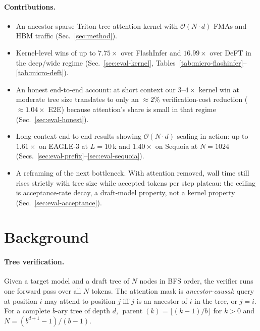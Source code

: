 \documentclass{article}
\newcommand{\bigO}[1]{\mathcal{O}(#1)}
\newcommand{\numtokens}{N}
\newcommand{\depth}{d}
\newcommand{\branching}{b}
\newcommand{\prefixlen}{L}
\DeclareMathOperator{\parent}{parent}
\begin{document}
\paragraph{Contributions.}
\begin{itemize}\itemsep0pt
  \item An ancestor-sparse Triton tree-attention kernel with
        $\bigO{\numtokens \!\cdot\! \depth}$ FMAs and HBM traffic
        (Sec.~\ref{sec:method}).
  \item Kernel-level wins of up to $7.75\times$ over FlashInfer and
        $16.99\times$ over DeFT in the deep/wide regime
        (Sec.~\ref{sec:eval-kernel}, Tables~\ref{tab:micro-flashinfer}--\ref{tab:micro-deft}).
  \item An honest end-to-end account: at short context our $3$--$4\times$
        kernel win at moderate tree size translates to only an
        $\approx\!2\%$ verification-cost reduction
        ($\approx\!1.04\times$ E2E) because attention's share is small
        in that regime (Sec.~\ref{sec:eval-honest}).
  \item Long-context end-to-end results showing
        $\bigO{\numtokens \!\cdot\! \depth}$ scaling in action: up to
        $1.61\times$ on EAGLE-3 at $\prefixlen{=}10\,$k and
        $1.40\times$ on Sequoia at $\numtokens{=}1024$
        (Secs.~\ref{sec:eval-prefix}--\ref{sec:eval-sequoia}).
  \item A reframing of the next bottleneck. With attention removed,
        wall time still rises strictly with tree size while accepted
        tokens per step plateau: the ceiling is acceptance-rate decay,
        a draft-model property, not a kernel property
        (Sec.~\ref{sec:eval-acceptance}).
\end{itemize}

\section{Background}
\label{sec:background}

\paragraph{Tree verification.}
Given a target model and a draft tree of $\numtokens$ nodes in BFS
order, the verifier runs one forward pass over all $\numtokens$ tokens.
The attention mask is \emph{ancestor-causal}: query at position $i$ may
attend to position $j$ iff $j$ is an ancestor of $i$ in the tree, or
$j {=} i$. For a complete $\branching$-ary tree of depth $\depth$,
$\parent(k){=}\lfloor(k{-}1)/\branching\rfloor$ for $k{>}0$ and
$\numtokens{=}(\branching^{\depth+1}{-}1)/(\branching{-}1)$.
\end{document}
